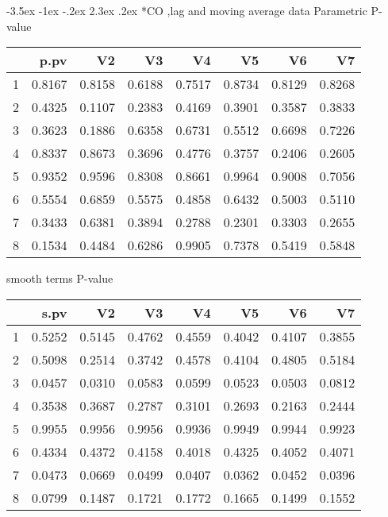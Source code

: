 \documentclass[a4paper, 12pt]{article}
\makeatletter
\def\Large{\fontsize{16}{24}\selectfont}
\renewcommand\section{\@startsection {section}{1}{\z@}%
                                   {-3.5ex \@plus -1ex \@minus -.2ex}%
                                   {2.3ex \@plus.2ex}%
                                   {\centering\normalfont\Large\bfseries}}
\makeatother
\begin{document}
\section*{CO ,lag and moving average data}
Parametric P-value
\begin{table}[ht]
\centering
\begin{tabular}{rrrrrrrr}
  \hline
 & p.pv & V2 & V3 & V4 & V5 & V6 & V7 \\
  \hline
1 & 0.8167 & 0.8158 & 0.6188 & 0.7517 & 0.8734 & 0.8129 & 0.8268 \\
  2 & 0.4325 & 0.1107 & 0.2383 & 0.4169 & 0.3901 & 0.3587 & 0.3833 \\
  3 & 0.3623 & 0.1886 & 0.6358 & 0.6731 & 0.5512 & 0.6698 & 0.7226 \\
  4 & 0.8337 & 0.8673 & 0.3696 & 0.4776 & 0.3757 & 0.2406 & 0.2605 \\
  5 & 0.9352 & 0.9596 & 0.8308 & 0.8661 & 0.9964 & 0.9008 & 0.7056 \\
  6 & 0.5554 & 0.6859 & 0.5575 & 0.4858 & 0.6432 & 0.5003 & 0.5110 \\
  7 & 0.3433 & 0.6381 & 0.3894 & 0.2788 & 0.2301 & 0.3303 & 0.2655 \\
  8 & 0.1534 & 0.4484 & 0.6286 & 0.9905 & 0.7378 & 0.5419 & 0.5848 \\
   \hline
\end{tabular}
\end{table}

smooth terms P-value
\begin{table}[ht]
\centering
\begin{tabular}{rrrrrrrr}
  \hline
 & s.pv & V2 & V3 & V4 & V5 & V6 & V7 \\
  \hline
1 & 0.5252 & 0.5145 & 0.4762 & 0.4559 & 0.4042 & 0.4107 & 0.3855 \\
  2 & 0.5098 & 0.2514 & 0.3742 & 0.4578 & 0.4104 & 0.4805 & 0.5184 \\
  3 & 0.0457 & 0.0310 & 0.0583 & 0.0599 & 0.0523 & 0.0503 & 0.0812 \\
  4 & 0.3538 & 0.3687 & 0.2787 & 0.3101 & 0.2693 & 0.2163 & 0.2444 \\
  5 & 0.9955 & 0.9956 & 0.9956 & 0.9936 & 0.9949 & 0.9944 & 0.9923 \\
  6 & 0.4334 & 0.4372 & 0.4158 & 0.4018 & 0.4325 & 0.4052 & 0.4071 \\
  7 & 0.0473 & 0.0669 & 0.0499 & 0.0407 & 0.0362 & 0.0452 & 0.0396 \\
  8 & 0.0799 & 0.1487 & 0.1721 & 0.1772 & 0.1665 & 0.1499 & 0.1552 \\
   \hline
\end{tabular}
\end{table}
\clearpage
\end{document}
